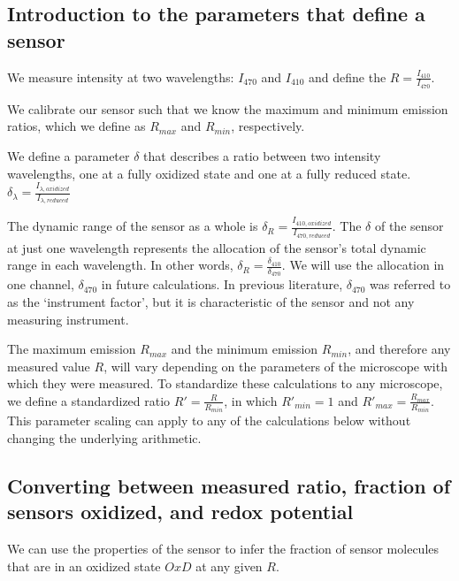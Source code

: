 \documentclass[]{article}
\title{}
\author{}
\date{}
\begin{document}
\subsection{Introduction to the parameters that define a
sensor}\label{introduction-to-the-parameters-that-define-a-sensor}

We measure intensity at two wavelengths: \(I_{470}\) and \(I_{410}\) and
define the \(R = \frac{I_{410}}{I_{470}}\).

We calibrate our sensor such that we know the maximum and minimum
emission ratios, which we define as \(R_{max}\) and \(R_{min}\),
respectively.

We define a parameter \(\delta\) that describes a ratio between two
intensity wavelengths, one at a fully oxidized state and one at a fully
reduced state.
\(\delta_{\lambda} = \frac{I_{\lambda, oxidized}}{I_{\lambda, reduced}}\)

The dynamic range of the sensor as a whole is
\(\delta_R = \frac{I_{410, oxidized}}{I_{470, reduced}}\). The
\(\delta\) of the sensor at just one wavelength represents the
allocation of the sensor's total dynamic range in each wavelength. In
other words, \(\delta_R = \frac{\delta_{410}}{\delta_{470}}\). We will
use the allocation in one channel, \(\delta_{470}\) in future
calculations. In previous literature, \(\delta_{470}\) was referred to
as the `instrument factor', but it is characteristic of the sensor and
not any measuring instrument.

The maximum emission \(R_{max}\) and the minimum emission \(R_{min}\),
and therefore any measured value \(R\), will vary depending on the
parameters of the microscope with which they were measured. To
standardize these calculations to any microscope, we define a
standardized ratio \(R' = \frac{R}{R_{min}}\), in which \(R'_{min} = 1\)
and \(R'_{max} = \frac{R_{max}}{R_{min}}\). This parameter scaling can
apply to any of the calculations below without changing the underlying
arithmetic.

\subsection{Converting between measured ratio, fraction of sensors
oxidized, and redox
potential}\label{converting-between-measured-ratio-fraction-of-sensors-oxidized-and-redox-potential}

We can use the properties of the sensor to infer the fraction of sensor
molecules that are in an oxidized state \(OxD\) at any given \(R\).
\end{document}
